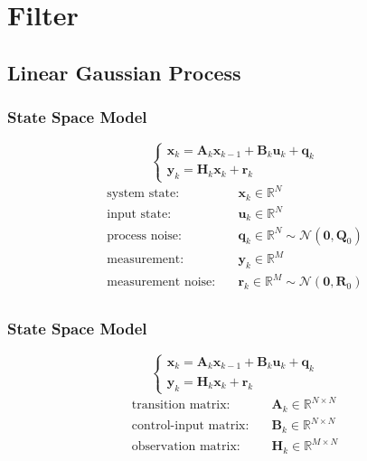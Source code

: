 \documentclass[14pt,hyperref={CJKbookmarks=true}]{beamer}
\theoremstyle{plain}
\theoremstyle{definition}
\theoremstyle{remark}
\begin{document}
\section{Filter}
\frame{\tableofcontents[currentsection]}
\subsection{Linear Gaussian Process}
\begin{frame}
\frametitle{State Space Model} 
\small
\begin{equation}
\begin{cases}
\mathbf{x}_k=\mathbf{A}_{k}\mathbf{x}_{k-1}+\mathbf{B}_{k}\mathbf{u}_{k}+\mathbf{q}_{k}\\
\mathbf{y}_k=\mathbf{H}_k\mathbf{x}_k+\mathbf{r}_k
\end{cases} 
\end{equation}
\pause
\begin{equation*}
\begin{split}
\text{system state:}\quad&\mathbf{x}_k\in\mathbb{R}^N\\
\text{input state:}\quad &\mathbf{u}_k\in\mathbb{R}^N\\
\text{process noise:}\quad &\mathbf{q}_k\in\mathbb{R}^N\sim \mathcal{N}(\mathbf{0},\mathbf{Q}_0)\\
\text{measurement:}\quad& \mathbf{y}_k\in\mathbb{R}^M\\
\text{measurement noise:}\quad& \mathbf{r}_k\in\mathbb{R}^M\sim \mathcal{N}(\mathbf{0},\mathbf{R}_0)\\
\end{split}
\end{equation*}
\end{frame}


\begin{frame}
\frametitle{State Space Model} 
\small
\begin{equation}
\begin{cases}
\mathbf{x}_k=\mathbf{A}_{k}\mathbf{x}_{k-1}+\mathbf{B}_{k}\mathbf{u}_{k}+\mathbf{q}_{k}\\
\mathbf{y}_k=\mathbf{H}_k\mathbf{x}_k+\mathbf{r}_k
\end{cases} 
\end{equation}
\pause
\begin{equation*}
\begin{split}
\text{transition matrix:}\quad& \mathbf{A}_k\in\mathbb{R}^{N\times N}\\
\text{control-input matrix:}\quad& \mathbf{B}_k\in\mathbb{R}^{N\times N}\\
\text{observation matrix:}\quad& \mathbf{H}_k\in\mathbb{R}^{M\times N}\\
\end{split}
\end{equation*}
\end{frame}
\end{document}
